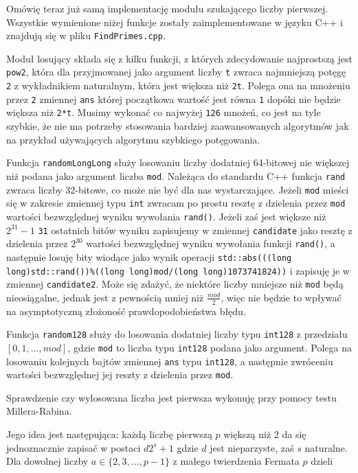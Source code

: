 \documentclass{article}
\begin{document}
Omówię teraz już samą implementację modułu szukającego liczby pierwszej. Wszystkie wymienione niżej funkcje zostały  zaimplementowane w języku C++ i znajdują się w pliku \texttt{FindPrimes.cpp}.

Moduł losujący składa się z kilku funkcji, z których zdecydowanie najprostszą jest \texttt{pow2}, która dla przyjmowanej jako argument liczby \texttt{t}
zwraca najmniejszą potęgę \texttt{2} z wykładnikiem naturalnym, która jest większa niż \texttt{2t}. Polega ona na
mnożeniu przez \texttt{2} zmiennej \texttt{ans} której początkowa wartość jest równa \texttt{1} dopóki nie będzie 
większa niż \texttt{2*t}. Musimy wykonać co najwyżej \texttt{126} mnożeń, co jest na tyle szybkie, że nie ma 
potrzeby stosowania bardziej zaawansowanych algorytmów jak na przykład 
używających algorytmu szybkiego potęgowania.

Funkcja \texttt{randomLongLong} służy losowaniu liczby dodatniej 64-bitowej nie większej niż podana jako argument 
liczba \texttt{mod}. Należąca do standardu C++ funkcja \texttt{rand} zwraca liczby 32-bitowe, co może nie być dla nas
wystarczające. Jeżeli \texttt{mod} mieści się w zakresie zmiennej typu \texttt{int} zwracam po prostu resztę z dzielenia przez \texttt{mod} wartości bezwzględnej
wyniku wywołania \texttt{rand()}. Jeżeli zaś jest większe niż $2^{31}-1$ \texttt{31} ostatnich bitów wyniku zapisujemy w zmiennej \texttt{candidate} jako resztę z dzielenia przez $2^{30}$ wartości bezwzględnej wyniku wywołania funkcji \texttt{rand()},
a następnie losuję bity wiodące jako wynik  operacji \texttt{std::abs(((long long)std::rand())\%((long long)mod/(long long)1073741824))} i zapisuję je w zmiennej \texttt{candidate2}. Może się zdażyć, że niektóre liczby mniejsze niż 
\texttt{mod} będą nieosiągalne, jednak jest z pewnością mniej niż $\frac{mod}{2}$, więc nie będzie to wpływać na 
asymptotyczną złożoność prawdopodobieństwa błędu. 

Funkcja \texttt{random128} służy do losowania dodatniej liczby typu
\texttt{\textunderscore \textunderscore int128} z przedziału $[0,1,...,mod]$, gdzie \texttt{mod}
to liczba typu \texttt{\textunderscore \textunderscore int128} podana jako argument. 
Polega na losowaniu kolejnych bajtów zmiennej \texttt{ans} typu \texttt{\textunderscore \textunderscore int128}, a następnie
zwróceniu wartości bezwzględnej jej reszty z dzielenia przez \texttt{mod}.

Sprawdzenie czy wylosowana liczba jest pierwsza wykonuję przy pomocy testu Millera-Rabina. 

Jego idea jest następująca: każdą liczbę pierwszą $p$ większą niż $2$ da się jednoznacznie zapisać w 
postaci $d2^s+1$
gdzie $d$ jest nieparzyste, zaś $s$ naturalne. Dla dowolnej liczby
$a \in \{2,3,...,p-1\}$ z małego twierdzenia Fermata $p$ dzieli
\end{document}

